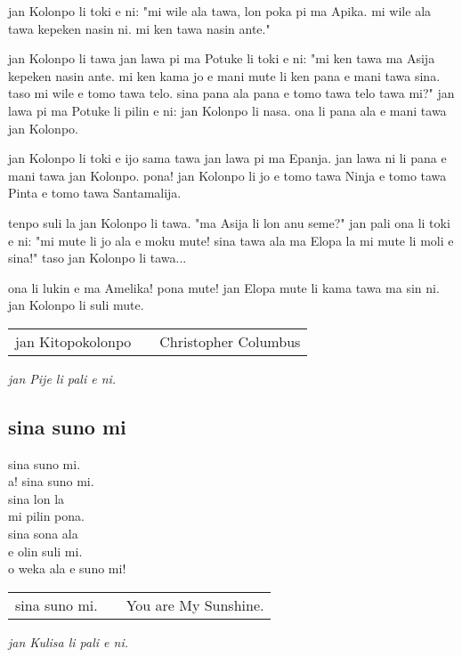 jan Kolonpo li toki e ni: "mi wile ala tawa, lon poka pi ma Apika. mi
wile ala tawa kepeken nasin ni. mi ken tawa nasin ante."

jan Kolonpo li tawa jan lawa pi ma Potuke li toki e ni: "mi ken tawa
ma Asija kepeken nasin ante. mi ken kama jo e mani mute li ken pana e
mani tawa sina. taso mi wile e tomo tawa telo. sina pana ala pana e
tomo tawa telo tawa mi?" jan lawa pi ma Potuke li pilin e ni: jan
Kolonpo li nasa. ona li pana ala e mani tawa jan Kolonpo.

jan Kolonpo li toki e ijo sama tawa jan lawa pi ma Epanja. jan lawa
ni li pana e mani tawa jan Kolonpo. pona! jan Kolonpo li jo e tomo
tawa Ninja e tomo tawa Pinta e tomo tawa Santamalija.

tenpo suli la jan Kolonpo li tawa. "ma Asija li lon anu seme?" jan
pali ona li toki e ni: "mi mute li jo ala e moku mute! sina tawa ala
ma Elopa la mi mute li moli e sina!" taso jan Kolonpo li tawa...

ona li lukin e ma Amelika! pona mute! jan Elopa mute li kama tawa ma
sin ni. jan Kolonpo li suli mute.

\begin{supertabular}{p{5,5cm}|ll}
    jan Kitopokolonpo &  & Christopher Columbus \\
\end{supertabular}

\textit{jan Pije li pali e ni. \cite{www:Pije:01}}

\subsection{sina suno mi}
sina suno mi. \\
a! sina suno mi. \\
sina lon la \\
mi pilin pona. \\
sina sona ala \\
e olin suli mi. \\
o weka ala e suno mi!

\begin{supertabular}{p{5,5cm}|ll}
    sina suno mi. &  & You are My Sunshine. \\
\end{supertabular}

\textit{jan Kulisa li pali e ni. \cite{www:janKluisa:01}}

